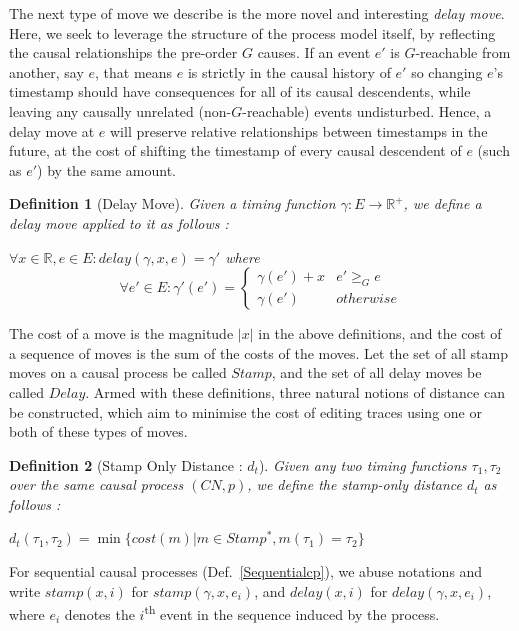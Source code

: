 \documentclass[conference]{IEEEtran}
\newcounter{cases}
\newtheorem{definition}{Definition}
\begin{document}
	The next type of move we describe is the more novel and interesting \textit{delay move}. 
	Here, we seek to leverage the structure of the process model itself, by reflecting the causal relationships the pre-order $G$ causes. 
	If an event $e'$ is $G$-reachable from another, say $e$, that means $e$ is strictly in the causal history of $e'$ so changing $e$'s timestamp should have consequences for all of its causal descendents, while leaving any causally unrelated (non-$G$-reachable) events undisturbed. 
	Hence, a delay move at $e$ will preserve relative relationships between timestamps in the future, at the cost of shifting the timestamp of every causal descendent of $e$  (such as $e'$) by the same amount. 
	\begin{definition}[Delay Move]
		Given a timing function $\gamma : E \to \mathbb{R}^+$, we define a delay move applied to it as follows : 
		
		$\forall x \in \mathbb{R}, e \in E : delay(\gamma, x, e) = \gamma'$ where 
		$$\forall e' \in E : \gamma'(e') = \begin{cases}
			\gamma(e') + x & e' \geq_G e \\
			\gamma(e')& otherwise
		\end{cases}$$
		
	\end{definition}
	
	The cost of a move is the magnitude $|x|$ in the above definitions, and the cost of a sequence of moves is the sum of the costs of the moves. 
	Let the set of all stamp moves on a causal process be called $Stamp$, and the set of all delay moves be called $Delay$. 
	Armed with these definitions, three natural notions of distance can be constructed, which aim to minimise the cost of editing traces using one or both of these types of moves. 
	
	\begin{definition}[Stamp Only Distance : $d_t$]
		Given any two timing functions $\tau_1, \tau_2$ over the same causal process $(CN, p)$, we define the stamp-only distance $d_t$ as follows : 
		
		$d_t(\tau_1, \tau_2) = \min \{cost(m) | {m \in Stamp^*}, {m(\tau_1) = \tau_2}\}$
	\end{definition}

        For sequential causal processes (Def.~\ref{Sequentialcp}), we abuse
        notations and write \(stamp(x, i)\) for \(stamp(\gamma, x, e_i)\), and
        \(delay(x, i)\) for \(delay(\gamma, x, e_i)\), where \(e_i\) denotes the
        \(i\)\textsuperscript{th} event in the sequence induced by the process.
	
\end{document}
